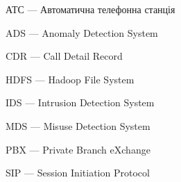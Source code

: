 \newpage
{}
\begin{ESKDexplanation}
  \item АТС --- Автоматична телефонна станція
  \item ADS --- Anomaly Detection System
  \item CDR --- Call Detail Record
  \item HDFS --- Hadoop File System
  \item IDS --- Intrusion Detection System
  \item MDS --- Misuse Detection System
  \item PBX --- Private Branch eXchange
  \item SIP --- Session Initiation Protocol
\end{ESKDexplanation}
